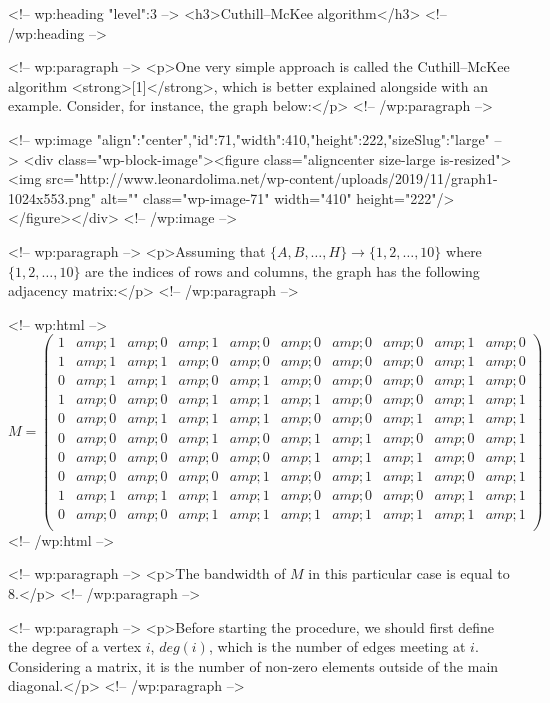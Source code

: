 <!-- wp:heading {"level":3} -->
<h3>Cuthill–McKee algorithm</h3>
<!-- /wp:heading -->

<!-- wp:paragraph -->
<p>One very simple approach is called the Cuthill–McKee algorithm <strong>[1]</strong>, which is better explained alongside with an example. Consider, for instance, the graph below:</p>
<!-- /wp:paragraph -->

<!-- wp:image {"align":"center","id":71,"width":410,"height":222,"sizeSlug":"large"} -->
<div class="wp-block-image"><figure class="aligncenter size-large is-resized"><img src="http://www.leonardolima.net/wp-content/uploads/2019/11/graph1-1024x553.png" alt="" class="wp-image-71" width="410" height="222"/></figure></div>
<!-- /wp:image -->

<!-- wp:paragraph -->
<p>Assuming that $\{A, B, \ldots, H\} \to \{1, 2, \ldots, 10\}$ where $\{1, 2, \ldots, 10\}$ are the indices of rows and columns, the graph has the following adjacency matrix:</p>
<!-- /wp:paragraph -->

<!-- wp:html -->
$$
M = 
\begin{pmatrix}
 1 &amp; 1 &amp; 0 &amp; 1 &amp; 0 &amp; 0 &amp; 0 &amp; 0 &amp; 1 &amp; 0\\ 
 1 &amp; 1 &amp; 1 &amp; 0 &amp; 0 &amp; 0 &amp; 0 &amp; 0 &amp; 1 &amp; 0\\ 
 0 &amp; 1 &amp; 1 &amp; 0 &amp; 1 &amp; 0 &amp; 0 &amp; 0 &amp; 1 &amp; 0\\
 1 &amp; 0 &amp; 0 &amp; 1 &amp; 1 &amp; 1 &amp; 0 &amp; 0 &amp; 1 &amp; 1\\ 
 0 &amp; 0 &amp; 1 &amp; 1 &amp; 1 &amp; 0 &amp; 0 &amp; 1 &amp; 1 &amp; 1\\ 
 0 &amp; 0 &amp; 0 &amp; 1 &amp; 0 &amp; 1 &amp; 1 &amp; 0 &amp; 0 &amp; 1\\ 
 0 &amp; 0 &amp; 0 &amp; 0 &amp; 0 &amp; 1 &amp; 1 &amp; 1 &amp; 0 &amp; 1\\ 
 0 &amp; 0 &amp; 0 &amp; 0 &amp; 1 &amp; 0 &amp; 1 &amp; 1 &amp; 0 &amp; 1\\ 
 1 &amp; 1 &amp; 1 &amp; 1 &amp; 1 &amp; 0 &amp; 0 &amp; 0 &amp; 1 &amp; 1\\ 
 0 &amp; 0 &amp; 0 &amp; 1 &amp; 1 &amp; 1 &amp; 1 &amp; 1 &amp; 1 &amp; 1\\ 
 \end{pmatrix}
$$
<!-- /wp:html -->

<!-- wp:paragraph -->
<p>The bandwidth of $M$ in this particular case is equal to $8$.</p>
<!-- /wp:paragraph -->

<!-- wp:paragraph -->
<p>Before starting the procedure, we should first define the degree of a vertex $i$, $deg(i)$, which is the number of edges meeting at $i$. Considering a matrix, it is the number of non-zero elements outside of the main diagonal.</p>
<!-- /wp:paragraph -->


